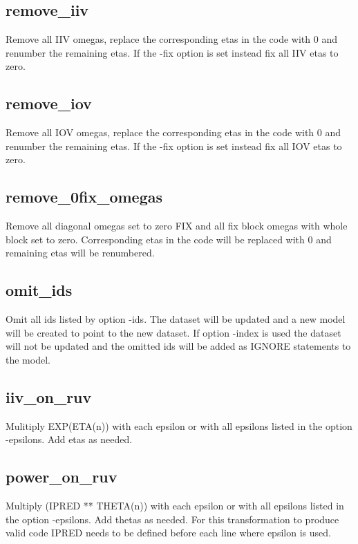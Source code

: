 \subsection{remove\_iiv}
Remove all IIV omegas, replace the corresponding etas in the code with 0 and renumber the remaining etas. If the -fix option is set instead fix all IIV etas to zero.

\subsection{remove\_iov}
Remove all IOV omegas, replace the corresponding etas in the code with 0 and renumber the remaining etas. If the -fix option is set instead fix all IOV etas to zero.

\subsection{remove\_0fix\_omegas}
Remove all diagonal omegas set to zero FIX and all fix block omegas with whole block set to zero. Corresponding etas in the code will be replaced with 0 and remaining etas will be renumbered.

\subsection{omit\_ids}
Omit all ids listed by option -ids. The dataset will be updated and a new model will be created to point to the new dataset. If option -index is used the dataset will not be updated and the omitted ids will be added as IGNORE statements to the model.

\subsection{iiv\_on\_ruv}
Mulitiply EXP(ETA(n)) with each epsilon or with all epsilons listed in the option -epsilons. Add etas as needed.

\subsection{power\_on\_ruv}
Multiply (IPRED ** THETA(n)) with each epsilon or with all epsilons listed in the option -epsilons. Add thetas as needed. For this transformation to produce valid code IPRED needs to be defined before each line where epsilon is used.


